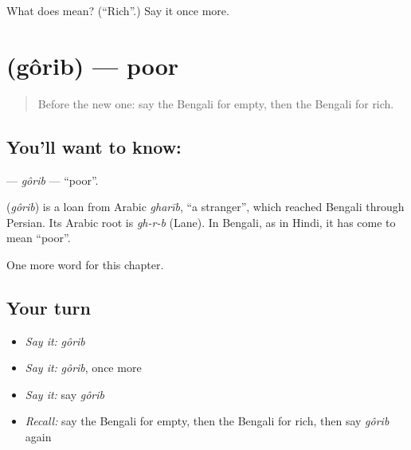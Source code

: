 \begin{tcolorbox}[breakable,colback=teal!4,colframe=teal!35!black,title={Before you move on}]
What does  mean? (\textquotedblleft{}Rich\textquotedblright{}.) Say it once more.
\end{tcolorbox}
\section[\texorpdfstring{\bn{গরিব} (gôrib)}{গরিব (gôrib)}]{ (gôrib) — poor}

\label{lesson:BN-C75-gorib}



\begin{quote}
Before the new one: say the Bengali for empty, then the Bengali for rich.
\end{quote}

\subsection*{You'll want to know: }
\textbf{} — \emph{gôrib} — \textquotedblleft{}poor\textquotedblright{}.

\begin{cousinweb}
\textbf{} (\emph{gôrib}) is a loan from Arabic \emph{gharīb}, \textquotedblleft{}a stranger\textquotedblright{}, which reached Bengali through Persian. Its Arabic root is \emph{gh-r-b} (Lane). In Bengali, as in Hindi, it has come to mean \textquotedblleft{}poor\textquotedblright{}.
\end{cousinweb}

\begin{grammarlens}[title={What you've built}]
One more word for this chapter.
\end{grammarlens}

\subsection*{Your turn}
\begin{itemize}
\raggedright
  \item \emph{Say it:} \emph{gôrib}
  \item \emph{Say it:} \emph{gôrib}, once more
  \item \emph{Say it:} say \emph{gôrib}
  \item \emph{Recall:} say the Bengali for empty, then the Bengali for rich, then say \emph{gôrib} again
\end{itemize}


